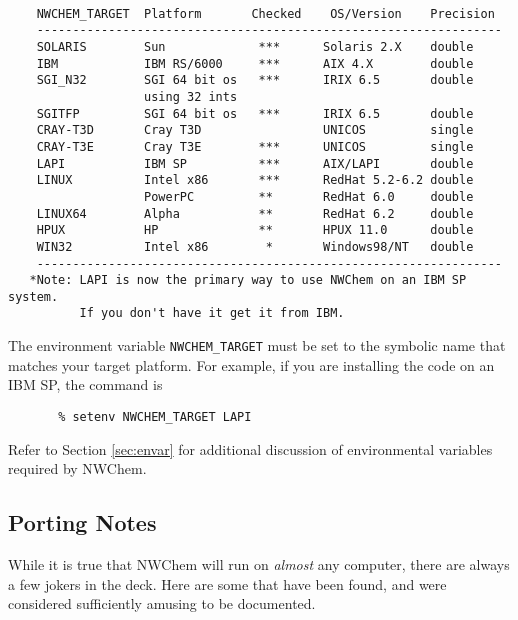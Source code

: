 \begin{verbatim}

    NWCHEM_TARGET  Platform       Checked    OS/Version    Precision
    -----------------------------------------------------------------
    SOLARIS        Sun             ***      Solaris 2.X    double
    IBM            IBM RS/6000     ***      AIX 4.X        double
    SGI_N32        SGI 64 bit os   ***      IRIX 6.5       double
                   using 32 ints
    SGITFP         SGI 64 bit os   ***      IRIX 6.5       double
    CRAY-T3D       Cray T3D                 UNICOS         single
    CRAY-T3E       Cray T3E        ***      UNICOS         single
    LAPI           IBM SP          ***      AIX/LAPI       double
    LINUX          Intel x86       ***      RedHat 5.2-6.2 double
                   PowerPC         **       RedHat 6.0     double
    LINUX64        Alpha           **       RedHat 6.2     double
    HPUX           HP              **       HPUX 11.0      double
    WIN32          Intel x86        *       Windows98/NT   double
    -----------------------------------------------------------------
   *Note: LAPI is now the primary way to use NWChem on an IBM SP system.
          If you don't have it get it from IBM. 

\end{verbatim}
The environment variable {\tt NWCHEM\_TARGET} must
be set to the symbolic name
that matches your target platform.  For example, if you are installing
the code on an IBM SP, the command is

\begin{verbatim}
       % setenv NWCHEM_TARGET LAPI
\end{verbatim}

Refer to Section \ref{sec:envar} for additional discussion of environmental variables
required by NWChem.

\subsection{Porting Notes}
\label{sec:PortingNotes}

While it is true that NWChem will run on {\em almost} any computer, there are always
a few jokers in the deck.  Here are some that have been found, and were
considered sufficiently amusing to be documented.

